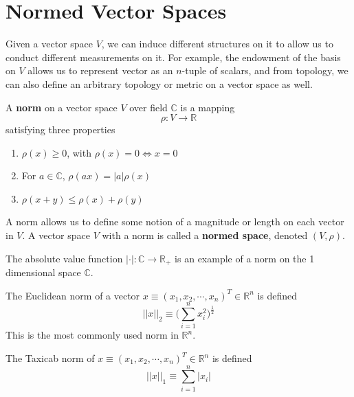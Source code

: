 \section{Normed Vector Spaces}

  Given a vector space $V$, we can induce different structures on it to allow us to conduct different measurements on it. For example, the endowment of the basis on $V$ allows us to represent vector as an $n$-tuple of scalars, and from topology, we can also define an arbitrary topology or metric on a vector space as well. 

  \begin{definition}[Norm]
    A \textbf{norm} on a vector space $V$ over field $\mathbb{C}$ is a mapping 
    \begin{equation}
      \rho: V \longrightarrow \mathbb{R}
    \end{equation}
    satisfying three properties 
    \begin{enumerate}
      \item $\rho (x) \geq 0$, with $\rho(x) = 0 \iff x = 0$
      \item For $a \in \mathbb{C}$, $\rho (a x) = |a| \rho(x)$ 
      \item $\rho(x + y) \leq \rho(x) + \rho(y)$ 
    \end{enumerate}
    A norm allows us to define some notion of a magnitude or length on each vector in $V$. A vector space $V$ with a norm is called a \textbf{normed space}, denoted $(V, \rho)$. 
  \end{definition}

  \begin{example}
    The absolute value function $|\cdot|: \mathbb{C} \longrightarrow \mathbb{R}_+$ is an example of a norm on the 1 dimensional space $\mathbb{C}$. 
  \end{example}

  \begin{example}
    The Euclidean norm of a vector $x \equiv (x_1, x_2, \cdots, x_n)^T \in \mathbb{R}^n$ is defined
    \begin{equation}
      ||x||_2 \equiv \bigg( \sum_{i=1}^n x_i^2 \bigg)^{\frac{1}{2}}
    \end{equation}
    This is the most commonly used norm in $\mathbb{R}^n$. 
  \end{example}

  \begin{example}
    The Taxicab norm of $x \equiv (x_1, x_2, \cdots, x_n)^T \in \mathbb{R}^n$ is defined
    \begin{equation}
      ||x||_1 \equiv \sum_{i=1}^n |x_i|
    \end{equation}
  \end{example}

